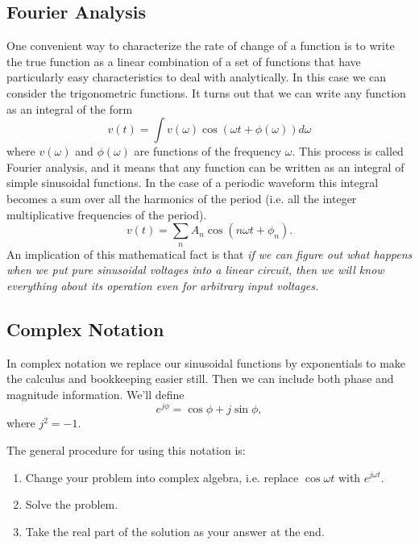 \documentclass{article}
\begin{document}
\subsection{Fourier Analysis}
One convenient way to characterize the rate of change of a function is to write the true function as a linear combination of a set of functions that have particularly easy characteristics to deal with analytically. In this case we can consider the trigonometric functions. It turns out that we can write any function as an integral of the form
\begin{equation}
v(t) = \int v(\omega) \cos \left( \omega t + \phi(\omega) \right) d\omega
\end{equation}
where $v(\omega)$ and $\phi(\omega)$ are functions of the frequency $\omega$. This process is called Fourier analysis, and it means that any function can be written as an integral of simple sinusoidal functions. In the case of a periodic waveform this integral becomes a sum over all the harmonics of the period (i.e. all the integer multiplicative frequencies of the period).
\begin{equation}
v(t) = \sum_n A_n \cos (n\omega t + \phi_n).
\end{equation}
An implication of this mathematical fact is that \emph{if we can figure out what happens when we put pure sinusoidal voltages into a linear circuit, then we will know everything about its operation even for arbitrary input voltages.}

\subsection{Complex Notation}
In complex notation we replace our sinusoidal functions by exponentials to make the calculus and bookkeeping easier still. Then we can include both phase and magnitude
information. We'll define 
\begin{equation}
e^{j\phi} = \cos\phi + j\sin\phi,
\end{equation}
where $j^2 = -1$.

The general procedure for using this notation is:
\begin{enumerate}
\item Change your problem into complex algebra, i.e. replace $\cos\omega t$ with $e^{j \omega t}$.
\item Solve the problem.
\item Take the real part of the solution as your answer at the end.
\end{enumerate}
\end{document}
